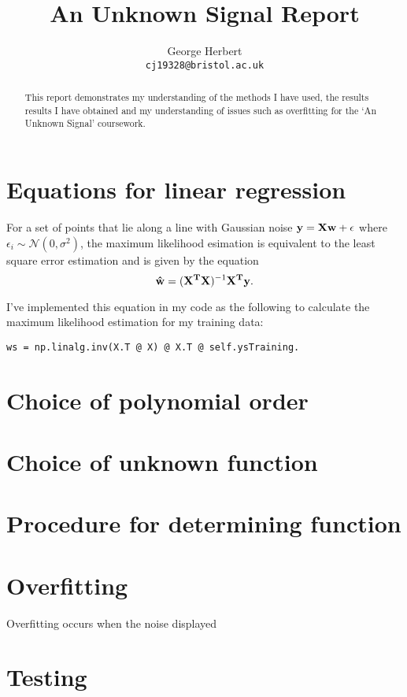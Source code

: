 \documentclass[onecolumn, 12pt, a4paper]{article}
\author{
  George Herbert\\
  \texttt{cj19328@bristol.ac.uk}
}
\title{An Unknown Signal Report}
\begin{document}
\maketitle

\begin{abstract}
    This report demonstrates my understanding of the methods I have 
    used, the results results I have obtained and my understanding
    of issues such as overfitting for the `An Unknown Signal'
    coursework.
\end{abstract}

\section{Equations for linear regression}

For a set of points that lie along a line with Gaussian noise 
$\vb{y} = \vb{X}\vb{w} + \vb{\epsilon}$ where $\epsilon_{i} \sim \mathcal{N}(0, \sigma^{2})$,
the maximum likelihood esimation is equivalent to the least square 
error estimation and is given by the equation
\[
    \vb{\hat{w}} = (\vb{X^{T}}\vb{X})^{-1}\vb{X^{T}}\vb{y}.
\]

I've implemented this equation in my code as the following to calculate
the maximum likelihood estimation for my training data:
\begin{verbatim}
ws = np.linalg.inv(X.T @ X) @ X.T @ self.ysTraining.
\end{verbatim}

\section{Choice of polynomial order}

\section{Choice of unknown function}

\section{Procedure for determining function}

\section{Overfitting}

Overfitting occurs when the noise displayed 

\section{Testing}
\end{document}
